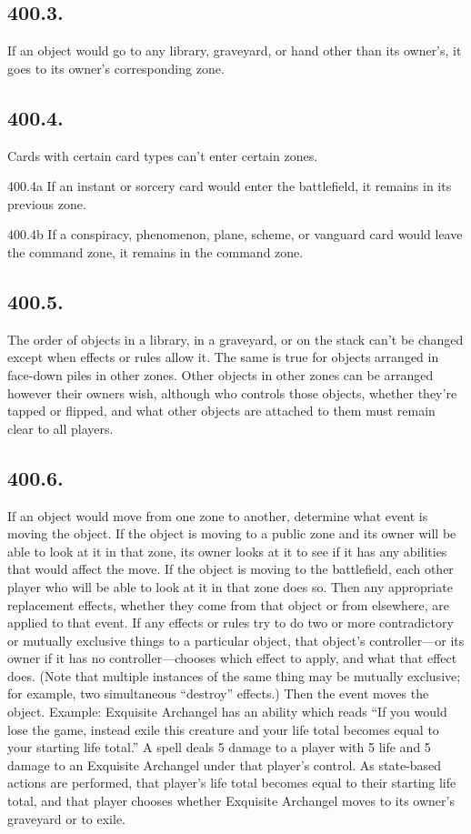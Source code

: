 \subsection*{400.3.}
If an object would go to any library, graveyard, or hand other than its owner’s, it goes to its owner’s corresponding zone.

\subsection*{400.4.}
Cards with certain card types can’t enter certain zones.

400.4a If an instant or sorcery card would enter the battlefield, it remains in its previous zone.

400.4b If a conspiracy, phenomenon, plane, scheme, or vanguard card would leave the command zone, it remains in the command zone.

\subsection*{400.5.}
The order of objects in a library, in a graveyard, or on the stack can’t be changed except when effects or rules allow it. The same is true for objects arranged in face-down piles in other zones. Other objects in other zones can be arranged however their owners wish, although who controls those objects, whether they’re tapped or flipped, and what other objects are attached to them must remain clear to all players.

\subsection*{400.6.}
If an object would move from one zone to another, determine what event is moving the object. If the object is moving to a public zone and its owner will be able to look at it in that zone, its owner looks at it to see if it has any abilities that would affect the move. If the object is moving to the battlefield, each other player who will be able to look at it in that zone does so. Then any appropriate replacement effects, whether they come from that object or from elsewhere, are applied to that event. If any effects or rules try to do two or more contradictory or mutually exclusive things to a particular object, that object’s controller—or its owner if it has no controller—chooses which effect to apply, and what that effect does. (Note that multiple instances of the same thing may be mutually exclusive; for example, two simultaneous “destroy” effects.) Then the event moves the object.
Example: Exquisite Archangel has an ability which reads “If you would lose the game, instead exile this creature and your life total becomes equal to your starting life total.” A spell deals 5 damage to a player with 5 life and 5 damage to an Exquisite Archangel under that player’s control. As state-based actions are performed, that player’s life total becomes equal to their starting life total, and that player chooses whether Exquisite Archangel moves to its owner’s graveyard or to exile.

